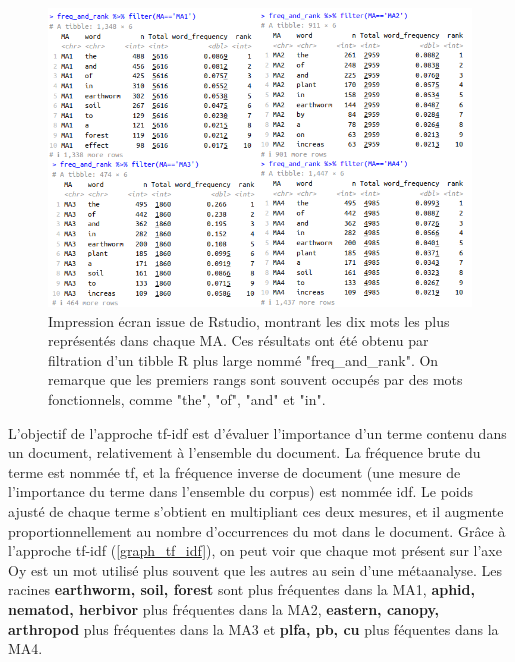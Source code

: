 \documentclass{book}
\begin{document}
\begin{figure}[htb] %
    \begin{center} %
        \includegraphics[width=1\textwidth]{word_rank_table.png}
        \caption{Impression écran issue de Rstudio, montrant les dix mots les plus représentés dans chaque MA. Ces résultats ont été obtenu par filtration d'un tibble R plus large nommé "freq\_and\_rank". On remarque que les premiers rangs sont souvent occupés par des mots fonctionnels, comme "the", "of", "and" et "in".\label{rank_table}}
    \end{center}  
\end{figure}
\FloatBarrier{} %

L'objectif de l'approche tf-idf est d'évaluer l'importance d'un terme contenu dans un document, relativement à l'ensemble du document. La fréquence brute du terme est nommée tf, et la fréquence inverse de document (une mesure de l'importance du terme dans l'ensemble du corpus) est nommée idf. Le poids ajusté de chaque terme s'obtient en multipliant ces deux mesures, et il augmente proportionnellement au nombre d'occurrences du mot dans le document. Grâce à l'approche tf-idf (\cref{graph_tf_idf}), on peut voir que chaque mot présent sur l'axe Oy est un mot utilisé plus souvent que les autres au sein d'une métaanalyse. Les racines \textbf{earthworm, soil, forest} sont plus fréquentes dans la MA1, \textbf{aphid, nematod, herbivor} plus fréquentes dans la MA2, \textbf{eastern, canopy, arthropod} plus fréquentes dans la MA3 et \textbf{plfa, pb, cu} plus féquentes dans la MA4.
\end{document}
